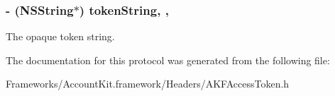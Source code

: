 \subsubsection[{token\+String}]{\setlength{\rightskip}{0pt plus 5cm}-\/ (N\+S\+String$\ast$) token\+String\hspace{0.3cm}{\ttfamily [read]}, {\ttfamily [nonatomic]}, {\ttfamily [copy]}}\label{protocol_a_k_f_access_token-p_a5fd03e48f3df5c786cd971df95fb3c95}
The opaque token string. 

The documentation for this protocol was generated from the following file\+:\begin{DoxyCompactItemize}
\item 
Frameworks/\+Account\+Kit.\+framework/\+Headers/A\+K\+F\+Access\+Token.\+h\end{DoxyCompactItemize}
